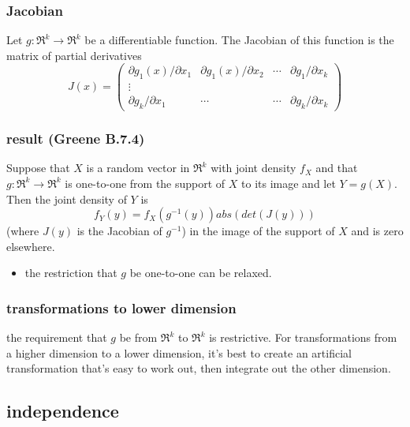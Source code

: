 \documentclass[11pt]{article}
\begin{document}
\subsubsection{Jacobian}
\label{sec-2-2-1}

      Let $g: \Re^k \to \Re^k$ be a differentiable function.  The
      Jacobian of this function is the matrix of partial derivatives
      \[ J(x) = \begin{pmatrix} \partial g_1(x) / \partial x_1 & \partial
      g_1(x) / \partial x_2 & \cdots & \partial g_1 / \partial x_k \\
      \vdots \\ \partial g_k / \partial x_1 & \cdots & \cdots & \partial g_k /
      \partial x_k \end{pmatrix} \]
\subsubsection{result (Greene B.7.4)}
\label{sec-2-2-2}

      Suppose that $X$ is a random vector in $\Re^k$ with joint
      density $f_X$ and that $g: \Re^k \to \Re^k$ is one-to-one from
      the support of $X$ to its image and let $Y = g(X)$.  Then the
      joint density of $Y$ is \[ f_Y(y) = f_X(g^{-1}(y)) abs(det( J(y)
      ))\] (where $J(y)$ is the Jacobian of $g^{-1}$) in the image of
      the support of $X$ and is zero elsewhere.
\begin{itemize}
\item the restriction that $g$ be one-to-one can be relaxed.
\end{itemize}
\subsubsection{transformations to lower dimension}
\label{sec-2-2-3}

      the requirement that $g$ be from $\Re^k$ to $\Re^k$ is restrictive.
      For transformations from a higher dimension to a lower dimension,
      it's best to create an artificial transformation that's easy to
      work out, then integrate out the other dimension.
\subsection{independence}
\label{sec-2-3}
\end{document}
